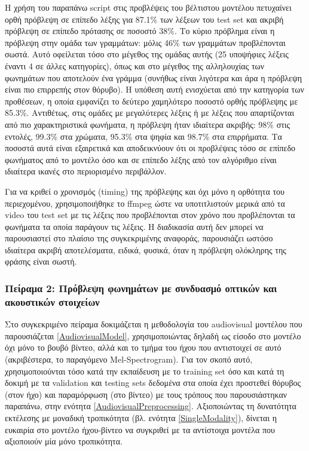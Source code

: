 Η χρήση του παραπάνω script στις προβλέψεις του βέλτιστου μοντέλου πετυχαίνει ορθή πρόβλεψη σε επίπεδο λέξης για 87.1\% των λέξεων του test set και ακριβή πρόβλεψη σε επίπεδο πρότασης σε ποσοστό 38\%. Το κύριο πρόβλημα είναι η πρόβλεψη στην ομάδα των γραμμάτων: μόλις 46\% των γραμμάτων προβλέπονται σωστά. Αυτό οφείλεται τόσο στο μέγεθος της ομάδας αυτής (25 υποψήφιες λέξεις έναντι 4 σε άλλες κατηγορίες), όπως και στο μέγεθος της αλληλουχίας των φωνημάτων που αποτελούν ένα γράμμα (συνήθως είναι λιγότερα και άρα η πρόβλεψη είναι πιο επιρρεπής στον θόρυβο). Η υπόθεση αυτή ενισχύεται από την κατηγορία των προθέσεων, η οποία εμφανίζει το δεύτερο χαμηλότερο ποσοστό ορθής πρόβλεψης με 85.3\%. Αντιθέτως, στις ομάδες με μεγαλύτερες λέξεις ή με λέξεις που απαρτίζονται από πιο χαρακτηριστικά φωνήματα, η πρόβλεψη ήταν ιδιαίτερα ακριβής: 98\% στις εντολές, 99.3\% στα χρώματα, 95.3\% στα ψηφία και 98.7\% στα επιρρήματα. Τα ποσοστά αυτά είναι εξαιρετικά και αποδεικνύουν ότι οι προβλέψεις τόσο σε επίπεδο φωνήματος από το μοντέλο όσο και σε επίπεδο λέξης από τον αλγόριθμο είναι ιδιαίτερα ικανές στο περιορισμένο περιβάλλον.

Για να κριθεί ο χρονισμός (timing) της πρόβλεψης και όχι μόνο η ορθότητα του περιεχομένου, χρησιμοποιήθηκε το ffmpeg ώστε να υποτιτλιστούν μερικά από τα video του test set με τις λέξεις που προβλέπονται στον χρόνο που προβλέπονται τα φωνήματα τα οποία παράγουν τις λέξεις. Η διαδικασία αυτή δεν μπορεί να παρουσιαστεί στο πλαίσιο της συγκεκριμένης αναφοράς, παρουσιάζει ωστόσο ιδιαίτερα ακριβή αποτελέσματα, ειδικά, φυσικά, όταν η πρόβλεψη ολόκληρης της φράσης είναι σωστή. 
\subsubsection{Πείραμα 2: Πρόβλεψη φωνημάτων με συνδυασμό οπτικών και ακουστικών στοιχείων}
\label{Experiment2}

Στο συγκεκριμένο πείραμα δοκιμάζεται η μεθοδολογία του audiovisual μοντέλου που παρουσιάζεται \ref{AudiovisualModel}, χρησιμοποιώντας δηλαδή ως είσοδο στο μοντέλο όχι μόνο το βουβό βίντεο, αλλά και το τμήμα του ήχου που αντιστοιχεί σε αυτό (ακριβέστερα, το παραγόμενο Mel-Spectrogram). Για τον σκοπό αυτό, χρησιμοποιούνται τόσο κατά την εκπαίδευση με το training set όσο και κατά τη δοκιμή με τα validation και testing sets δεδομένα στα οποία έχει προστεθεί θόρυβος (στον ήχο) και παραμόρφωση (στο βίντεο) με τους τρόπους που παρουσιάστηκαν παραπάνω, στην ενότητα \ref{AudiovisualPreprocessing}. Αξιοποιώντας τη δυνατότητα εκτέλεσης με μοναδική τροπικότητα (βλ. ενότητα \ref{SingleModality}), δίνεται η ευκαιρία στο μοντέλο ήχου-βίντεο να συγκριθεί με τα αντίστοιχα μοντέλα που αξιοποιούν μία μόνο τροπικότητα.


